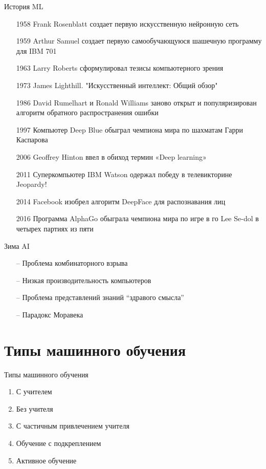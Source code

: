 \documentclass[10pt]{beamer}
\begin{document}
\begin{frame}{История ML}
	\begin{itemize} [<+->]
	  \item[1958] Frank Rosenblatt создает первую искусственную нейронную сеть
	  \item[1959] Arthur Samuel создает первую самообучающуюся шашечную программу для IBM 701
	  \item[1963] Larry Roberts сформулировал тезисы компьютерного зрения
	  \item[1973] James Lighthill. "Искусственный интеллект: Общий обзор"
	  \item[1986] David Rumelhart и Ronald Williams заново открыт и популяризирован алгоритм обратного распространения ошибки
	  \item[1997] Компьютер Deep Blue обыграл чемпиона мира по шахматам Гарри Каспарова
	  \item[2006] Geoffrey Hinton ввел в обиход термин «Deep learning» 
	  \item[2011] Суперкомпьютер IBM Watson одержал победу в телевикторине Jeopardy!
	  \item[2014] Facebook изобрел алгоритм DeepFace для распознавания лиц
	  \item[2016] Программа AlphaGo обыграла чемпиона мира по игре в го Lee Se-dol в четырех партиях из пяти
	\end{itemize}
\end{frame}

{
\begin{frame}{Зима AI}
	\begin{itemize} [<+->]
	  \item[--] Проблема комбинаторного взрыва
	  \item[--] Низкая производительность компьютеров
	  \item[--] Проблема представлений знаний “здравого смысла”
	  \item[--] Парадокс Моравека
	\end{itemize}
\end{frame}
}

\section{Типы машинного обучения}

\begin{frame}{Типы машинного обучения}
	\begin{enumerate}
	  \item С учителем
	  \item Без учителя
	  \item С частичным привлечением учителя
	  \item Обучение с подкреплением
	  \item Активное обучение
	\end{enumerate}
\end{frame}
\end{document}
